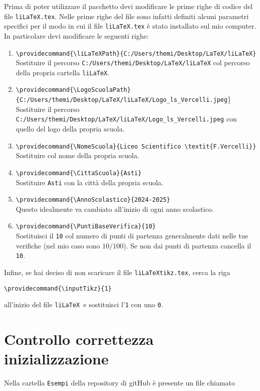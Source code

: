 \documentclass[italian, a4paper]{article}
\newcommand{\bs}{\textbackslash}
\newcommand{\ttt}[1]{\texttt{#1}}
\newcommand{\liLaTeX}{\ttt{liLaTeX}}
\begin{document}
Prima di poter utilizzare il pacchetto devi modificare le prime righe di codice del file \ttt{liLaTeX.tex}. Nelle prime righe del file sono infatti definiti alcuni parametri specifici per il modo in cui il file \ttt{liLaTeX.tex} è stato installato sul mio computer. In particolare devi modificare le seguenti righe:
\begin{enumerate}
\item \ttt{\bs providecommand\{\bs liLaTeXPath\}\{C:/Users/themi/Desktop/LaTeX/liLaTeX\}}\\
Sostituire il percorso \ttt{C:/Users/themi/Desktop/LaTeX/liLaTeX} col percorso della propria cartella \liLaTeX.
\item \ttt{\bs providecommand\{\bs LogoScuolaPath\}\{C:/Users/themi/Desktop/LaTeX/liLaTeX/Logo\_ls\_Vercelli.jpeg}\}\\
Sostituire il percorso \ttt{C:/Users/themi/Desktop/LaTeX/liLaTeX/Logo\_ls\_Vercelli.jpeg} con quello del logo della propria scuola.
\item \ttt{\bs providecommand\{\bs NomeScuola\}\{Liceo Scientifico \bs textit\{F.Vercelli\}\}}\\
Sostituire col nome della propria scuola.
\item \ttt{\bs providecommand\{\bs CittaScuola\}\{Asti\}}\\
Sostituire \ttt{Asti} con la città della propria scuola.
\item \ttt{\bs providecommand\{\bs AnnoScolastico\}\{2024-2025\}}\\
Questo idealmente va cambiato all'inizio di ogni anno scolastico.
\item \ttt{\bs providecommand\{\bs PuntiBaseVerifica\}\{10\}}\\
Sostituisci il \ttt{10} col numero di punti di partenza generalmente dati nelle tue verifiche (nel mio caso sono $10/100$). Se non dai punti di partenza cancella il \ttt{10}.
\end{enumerate}

Infine, se hai deciso di non scaricare il file \ttt{liLaTeXtikz.tex}, cerca la riga

\begin{center}\ttt{\bs providecommand\{\bs inputTikz\}\{1\}}\end{center}

all'inizio del file \liLaTeX\ e sostituisci l'\ttt{1} con uno \ttt{0}.

\section{Controllo correttezza inizializzazione}\label{controllo}
Nella cartella \ttt{Esempi} della repository di gitHub è presente un file chiamato
\end{document}
